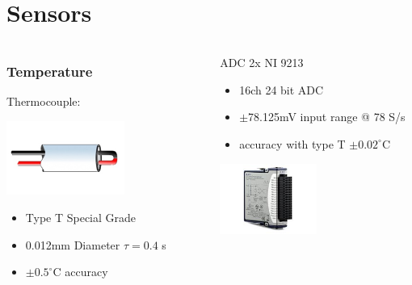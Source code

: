 \documentclass[10pt]{beamer}
\begin{document}


\section{Sensors}
\begin{frame}


\begin{columns}
\begin{column}{0.5\textwidth}
  \frametitle{Temperature}
Thermocouple:
 \begin{center}
     \includegraphics[width=0.6\textwidth]{Therm}
     \end{center}
\begin{itemize}
\item Type T Special Grade
\item 0.012mm Diameter $\tau = 0.4$ s
\item $\pm 0.5^{\circ}$C accuracy

\end{itemize}
\end{column}
\begin{column}{0.5\textwidth}  %
  ADC 2x NI 9213 
     
     \begin{itemize}
      \item 16ch 24 bit ADC
      \item $\pm$78.125mV input range @ 78 S/s
      \item accuracy with type T $\pm 0.02^{\circ}$C
      \end{itemize}
      
       \begin{center}
     \includegraphics[width=0.5\textwidth]{adc}
     \end{center}
\end{column}
\end{columns}
\end{frame}
\end{document}

